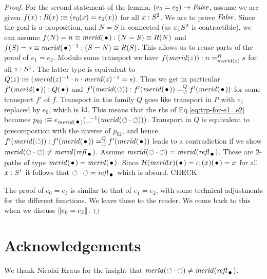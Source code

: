 \documentclass[english,a4]{article}
\begin{document}
\begin{proof}
For the second statement of the lemma, $(e_0 = e_2)\to\mathop{\mathit{False}}$,
assume we are given $f(x):R(x)\mathrel{\hbox{:}\mkern-5mu\equiv}(e_0(x)=e_2(x))$ for all $x:S^2$.
We are to prove $\mathop{\mathit{False}}$. Since the goal is a proposition,
and $N=S$ is connected (as $\pi_1 S^2$ is contractible),
we can assume $f(N)=n\jdeq\mrd(\base):(N=S)\jdeq R(N)$ and 
$f(S)=s\jdeq\mrd(\base)^{-1}:(S=N)\jdeq R(S)$.
This allows us to reuse parts of the proof of $e_1 = e_2$.
Modulo some transport we have $f(\mathit{merid}(z)): n=^R_{\mathit{merid}(z)}s$
for all $z:{S^1}$. The latter type is equivalent to
$Q(z)\mathrel{\hbox{:}\mkern-5mu\equiv}(\mathit{merid}(z)^{-1}\cdot n\cdot \mathit{merid}(z)^{-1} = s)$.
Thus we get in particular $f'(\mrd(\base)): Q(\base)$ and 
$f'(\mrd(\Sloop)): f'(\mrd(\base))=^Q_{\Sloop}f'(\mrd(\base))$
for some transport $f'$ of $f$.
Transport in the family $Q$ goes like transport in $P$ with $e_1$
replaced by $e_0$, which is $\mathord{\mathrm{id}}$. 
This means that the rhs of Eq.\ref{eq:trp-for-e1=e2} becomes
$p_{02}\defeq e_{\mrd(\base)}(\_\!^{-1}(\mrd(\Sloop\cdot\Sloop)))$.
Transport in $Q$ is equivalent to precompostion with the inverse of $p_{02}$,
and hence $f'(\mrd(\Sloop)): f'(\mrd(\base))=^Q_{\Sloop}f'(\mrd(\base))$
leads to a contradiction if we show
$\mrd(\Sloop\cdot\Sloop) \neq \mrd(\refl{\base})$.
Assume $\mrd(\Sloop\cdot\Sloop) = \mrd(\refl{\base})$.
These are 2-paths of type $\mrd(\base)=\mrd(\base)$.
Since $\hopffam(\mrd{x})(\base) = \iota_1(x)(\base) = x$ for all $x:{S^1}$
it follows that $\Sloop\cdot\Sloop = \refl{\base}$ which is absurd. CHECK

The proof of $e_0 = e_3$ is similar to that of $e_1 = e_2$, with some
technical adjustments for the different functions. We leave these to the
reader. We come back to this when we discuss $\lVert e_0 = e_3\rVert$.
\end{proof}

\section*{Acknowledgements}
We thank Nicolai Kraus for the insight that
$\mrd(\Sloop\cdot\Sloop) \neq \mrd(\refl{\base})$.
\end{document}
